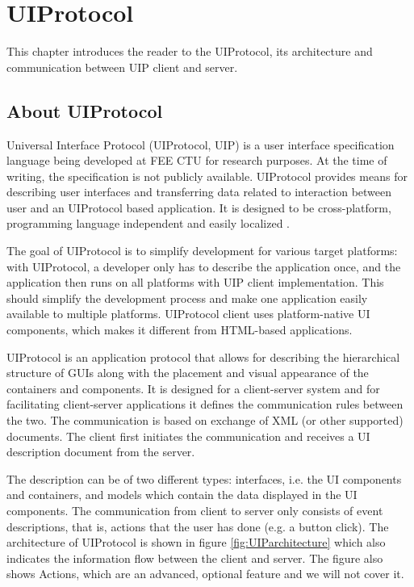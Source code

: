 \section{UIProtocol}
This chapter introduces the reader to the UIProtocol, its architecture and communication between UIP client and server.

\subsection{About UIProtocol}
Universal Interface Protocol (UIProtocol, UIP) is a user interface specification language \cite{uip} being developed at FEE CTU for research purposes. At the time of writing, the specification is not publicly available. UIProtocol provides means for describing user interfaces and transferring data related to interaction between user and an UIProtocol based application. It is designed to be cross-platform, programming language independent and easily localized \cite{uip}.

The goal of UIProtocol is to simplify development for various target platforms: with UIProtocol, a developer only has to describe the application once, and the application then runs on all platforms with UIP client implementation. This should simplify the development process and make one application easily available to multiple platforms. UIProtocol client uses platform-native UI components, which makes it different from HTML-based applications.

UIProtocol is an application protocol that allows for describing the hierarchical structure of GUIs along with the placement and visual appearance of the containers and components. It is designed for a client-server system and for facilitating client-server applications it defines the communication rules between the two. The communication is based on exchange of XML (or other supported) documents. The client first initiates the communication and receives a UI description document from the server.

The description can be of two different types: interfaces, i.e. the UI components and containers, and models which contain the data displayed in the UI components. The communication from client to server only consists of event descriptions, that is, actions that the user has done (e.g. a button click). The architecture of UIProtocol is shown in figure \ref{fig:UIParchitecture} which also indicates the information flow between the client and server. The figure also shows Actions, which are an advanced, optional feature and we will not cover it.

